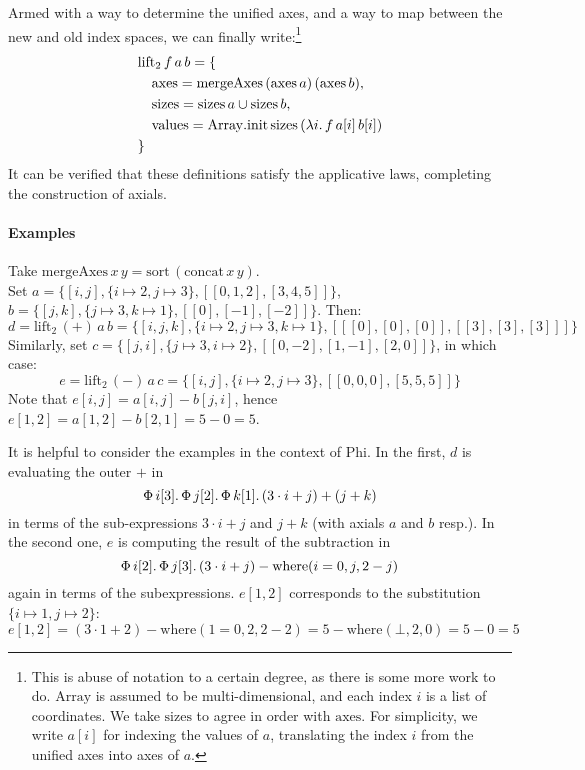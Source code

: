 Armed with a way to determine the unified axes, and a way to map between the new and old index spaces, we can finally write:\footnote{This is abuse of notation to a certain degree, as there is some more work to do. $\mathrm{Array}$ is assumed to be multi-dimensional, and each index $i$ is a list of coordinates. We take $\mathrm{sizes}$ to agree in order with $\mathrm{axes}$. For simplicity, we write $a[i]$ for indexing the values of $a$, translating the index $i$ from the unified axes into axes of $a$.}
\begin{align*} 
&\mathrm{lift}_2\,f\,a\,b = \{ \\
&\quad \mathrm{axes} = \mathrm{mergeAxes}\,(\mathrm{axes}\,a)\,(\mathrm{axes}\,b), \\
&\quad \mathrm{sizes} = \mathrm{sizes}\,a \cup \mathrm{sizes}\,b, \\
&\quad \mathrm{values} = \mathrm{Array.init}\,\mathrm{sizes}\,(\lambda i \ldotp f\, a[i]\, b[i]) \\
&\}
\end{align*}
It can be verified that these definitions satisfy the applicative laws, completing the construction of axials.

\paragraph{Examples} Take $\mathrm{mergeAxes}\,x\,y = \mathrm{sort}\,(\mathrm{concat}\,x\,y)$. \\ Set $a = \{ [i, j], \{i \mapsto 2, j \mapsto 3 \}, [[0, 1, 2], [3, 4, 5]] \} $, $b = \{ [j, k], \{ j \mapsto 3, k \mapsto 1 \}, [[0], [-1], [-2]] \}$. Then:
$$ d = \mathrm{lift}_2\,(+)\,a\,b = \{ [i,j,k], \{i \mapsto 2, j \mapsto 3, k \mapsto 1 \}, [[[0], [0], [0]], [[3], [3], [3]]] \} $$
Similarly, set $c = \{ [j, i], \{ j \mapsto 3, i \mapsto 2 \}, [[0, -2], [1, -1], [2, 0]] \}$, in which case:
$$ e = \mathrm{lift}_2\,(-)\,a\,c = \{ [i, j], \{i \mapsto 2, j \mapsto 3 \}, [[0, 0, 0], [5, 5, 5]] \} $$
Note that $e[i, j] = a[i, j] - b[j, i]$, hence $e[1, 2] = a[1, 2] - b[2, 1] = 5 - 0 = 5$. 

It is helpful to consider the examples in the context of Phi. In the first, $d$ is evaluating the outer $+$ in $$\Phi\, {i}[{3}] \ldotp {\Phi\, {j}[{2}] \ldotp {\Phi\, {k}[{1}] \ldotp {(3 \cdot i + j) + (j + k)}}}$$ in terms of the sub-expressions $3 \cdot i + j$ and $j + k$ (with axials $a$ and $b$ resp.). In the second one, $e$ is computing the result of the subtraction in 
$$\Phi\, {i}[{2}] \ldotp {\Phi\, {j}[{3}] \ldotp {(3 \cdot i + j) - \mathrm{where}(i = 0, j, 2 - j)}}$$ again in terms of the subexpressions. $e[1, 2]$ corresponds to the substitution $\{ i \mapsto 1, j \mapsto 2 \}$:
$$ e[1, 2] = (3 \cdot 1 + 2) - \mathrm{where}(1 = 0, 2, 2 - 2) = 5 - \mathrm{where}(\bot, 2, 0) = 5 - 0 = 5 $$

